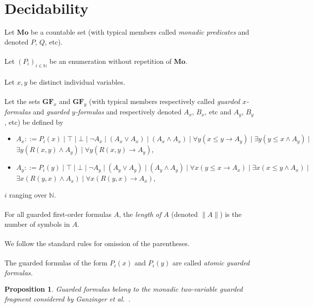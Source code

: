 \documentclass[draft]{article}
\newtheorem{proposition}{Proposition}
\def\N{\mathbb{N}}
\def\Mona{\mathbf{Mo}}
\def\GFo{\mathbf{GF}}
\begin{document}
\section{Decidability}\label{section:decidability}
%
%
Let $\Mona$ be a countable set (with typical members called {\em monadic predicates} and denoted $P$, $Q$, etc).
%
%
\\
\\
%
%
Let $(P_{i})_{i{\in}\N}$ be an enumeration without repetition of $\Mona$.
%
%
\\
\\
%
%
Let $x,y$ be distinct individual variables.
%
%
\\
\\
%
%
Let the sets $\GFo_{x}$ and $\GFo_{y}$ (with typical members respectively called {\em guarded $x$-formu\-las}\/ and {\em guarded $y$-formulas}\/ and respectively denoted $A_{x}$, $B_{x}$, etc and $A_{y}$, $B_{y}$, etc) be defined by
%
%
\begin{itemize}
%
%
\item $A_{x}::=P_{i}(x){\mid}{\top}{\mid}{\bot}{\mid}{\neg}A_{x}{\mid}(A_{x}{\vee}A_{x}){\mid}(A_{x}{\wedge}A_{x}){\mid}{\forall y}(x{\leq}y{\rightarrow}A_{y}){\mid}{\exists y}(y{\leq}x{\wedge}A_{y}){\mid}
%
%
%
%
%
%
%
$\linebreak$
%
%
%
%
%
%
{\exists y}(R(x,y){\wedge}A_{y}){\mid}{\forall y}(R(x,y){\rightarrow}A_{y})$,
%
%
\item $A_{y}::=P_{i}(y){\mid}{\top}{\mid}{\bot}{\mid}{\neg}A_{y}{\mid}(A_{y}{\vee}A_{y}){\mid}(A_{y}{\wedge}A_{y}){\mid}{\forall x}(y{\leq}x{\rightarrow}A_{x}){\mid}{\exists x}(x{\leq}y{\wedge}A_{x}){\mid}
%
%
%
%
%
%
%
$\linebreak$
%
%
%
%
%
%
{\exists x}(R(y,x){\wedge}A_{x}){\mid}{\forall x}(R(y,x){\rightarrow}A_{x})$,
%
%
\end{itemize}
%
%
$i$ ranging over $\N$.
%
%
\\
\\
%
%
For all guarded first-order formulas $A$, the {\em length of $A$}\/ (denoted ${\parallel}A{\parallel}$) is the number of symbols in $A$.
%
%
\\
\\
%
%
We follow the standard rules for omission of the parentheses.
%
%
\\
\\
%
The guarded formulas of the form $P_{i}(x)$ and $P_{i}(y)$ are called {\em atomic guarded formulas.}
%
%
\begin{proposition}\label{Proposition:two:variable:fragment:only}
%
%
Guarded formulas belong to the monadic two-variable guarded fragment considered by Ganzinger {\em et al.}~\cite[Section~$3$]{Ganzinger:et:al:1999}.
%
%
\end{proposition}
\end{document}
